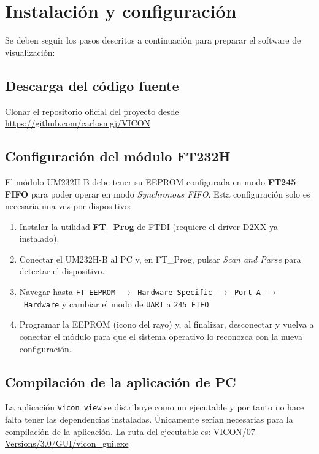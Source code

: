 \section{Instalación y configuración}
\label{sec:instalacion}

Se deben seguir los pasos descritos a continuación para preparar el software de visualización:

\subsection{Descarga del código fuente}
Clonar el repositorio oficial del proyecto desde \url{https://github.com/carlosmgj/VICON}

\subsection{Configuración del módulo FT232H}
El módulo UM232H-B debe tener su \ac{EEPROM} configurada en modo \textbf{FT245 FIFO} para poder operar en modo \textit{Synchronous FIFO}. Esta configuración solo es necesaria una vez por dispositivo:

\begin{enumerate}
    \item Instalar la utilidad \textbf{FT\_Prog} de FTDI (requiere el driver D2XX ya instalado).
    \item Conectar el UM232H-B al PC y, en FT\_Prog, pulsar \textit{Scan and Parse} para detectar el dispositivo.
    \item Navegar hasta \texttt{FT EEPROM~$\rightarrow$~Hardware Specific~$\rightarrow$~Port~A~$\rightarrow$~Hardware} y cambiar el modo de \texttt{UART} a \texttt{245~FIFO}.
    \item Programar la \ac{EEPROM} (icono del rayo) y, al finalizar, desconectar y vuelva a conectar el módulo para que el sistema operativo lo reconozca con la nueva configuración.
\end{enumerate}

\subsection{Compilación de la aplicación de PC}
La aplicación \texttt{vicon\_view} se distribuye como un ejecutable y por tanto no hace falta tener las dependencias instaladas. Únicamente serían necesarias para la compilación de la aplicación.
La ruta del ejecutable es: \url{VICON/07-Versions/3.0/GUI/vicon_gui.exe}
